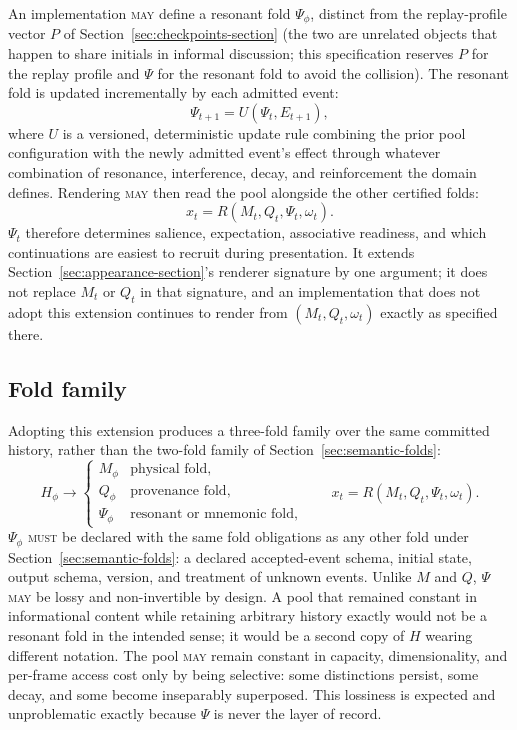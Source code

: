 \documentclass[11pt]{article}
\newcommand{\MUST}{\textsc{must}}
\newcommand{\MAY}{\textsc{may}}
\begin{document}
An implementation \MAY{} define a resonant fold $\Psi_\phi$, distinct from the replay-profile vector $P$ of Section~\ref{sec:checkpoints-section} (the two are unrelated objects that happen to share initials in informal discussion; this specification reserves $P$ for the replay profile and $\Psi$ for the resonant fold to avoid the collision). The resonant fold is updated incrementally by each admitted event:
\[
\Psi_{t+1} = U(\Psi_t, E_{t+1}),
\]
where $U$ is a versioned, deterministic update rule combining the prior pool configuration with the newly admitted event's effect through whatever combination of resonance, interference, decay, and reinforcement the domain defines. Rendering \MAY{} then read the pool alongside the other certified folds:
\[
x_t = R(M_t, Q_t, \Psi_t, \omega_t).
\]
$\Psi_t$ therefore determines salience, expectation, associative readiness, and which continuations are easiest to recruit during presentation. It extends Section~\ref{sec:appearance-section}'s renderer signature by one argument; it does not replace $M_t$ or $Q_t$ in that signature, and an implementation that does not adopt this extension continues to render from $(M_t, Q_t, \omega_t)$ exactly as specified there.

\subsection{Fold family}

Adopting this extension produces a three-fold family over the same committed history, rather than the two-fold family of Section~\ref{sec:semantic-folds}:
\[
H_\phi \longrightarrow
\begin{cases}
M_\phi & \text{physical fold},\\
Q_\phi & \text{provenance fold},\\
\Psi_\phi & \text{resonant or mnemonic fold},
\end{cases}
\qquad
x_t = R(M_t, Q_t, \Psi_t, \omega_t).
\]
$\Psi_\phi$ \MUST{} be declared with the same fold obligations as any other fold under Section~\ref{sec:semantic-folds}: a declared accepted-event schema, initial state, output schema, version, and treatment of unknown events. Unlike $M$ and $Q$, $\Psi$ \MAY{} be lossy and non-invertible by design. A pool that remained constant in informational content while retaining arbitrary history exactly would not be a resonant fold in the intended sense; it would be a second copy of $H$ wearing different notation. The pool \MAY{} remain constant in capacity, dimensionality, and per-frame access cost only by being selective: some distinctions persist, some decay, and some become inseparably superposed. This lossiness is expected and unproblematic exactly because $\Psi$ is never the layer of record.
\end{document}
